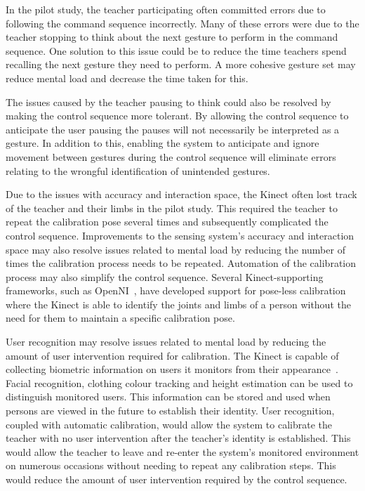 \documentclass[link]{IWCOMP}
\begin{document}
In the pilot study, the teacher participating often committed errors due to following the command sequence incorrectly.
Many of these errors were due to the teacher stopping to think about the next gesture to perform in the command sequence.
One solution to this issue could be to reduce the time teachers spend recalling the next gesture they need to perform.
A more cohesive gesture set may reduce mental load and decrease the time taken for this.

The issues caused by the teacher pausing to think could also be resolved by making the control sequence more tolerant.
By allowing the control sequence to anticipate the user pausing the pauses will not necessarily be interpreted as a gesture.
In addition to this, enabling the system to anticipate and ignore movement between gestures during the control sequence will eliminate errors relating to the wrongful identification of unintended gestures.

Due to the issues with accuracy and interaction space, the Kinect often lost track of the teacher and their limbs in the pilot study.
This required the teacher to repeat the calibration pose several times and subsequently complicated the control sequence.
Improvements to the sensing system's accuracy and interaction space may also resolve issues related to mental load by reducing the number of times the calibration process needs to be repeated.
Automation of the calibration process may also simplify the control sequence.
Several Kinect-supporting frameworks, such as OpenNI~\cite{Organisation2011}, have developed support for pose-less calibration where the Kinect is able to identify the joints and limbs of a person without the need for them to maintain a specific calibration pose.

User recognition may resolve issues related to mental load by reducing the amount of user intervention required for calibration.
The Kinect is capable of collecting biometric information on users it monitors from their appearance~\cite{Leyvand2011}.
Facial recognition, clothing colour tracking and height estimation can be used to distinguish monitored users.
This information can be stored and used when persons are viewed in the future to establish their identity.
User recognition, coupled with automatic calibration, would allow the system to calibrate the teacher with no user intervention after the teacher's identity is established.
This would allow the teacher to leave and re-enter the system's monitored environment on numerous occasions without needing to repeat any calibration steps.
This would reduce the amount of user intervention required by the control sequence.
\end{document}

